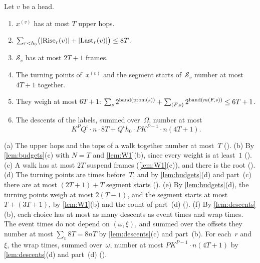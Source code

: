 \begin{lemma}[Totals]\label{lem:totals}
Let $v$ be a head.
\begin{enumerate}[label=(\alph*)]
\item $x^{(v)}$ has at most $T$ upper hops.
\item $\sum_{r<h_0}\bigl(\lvert \mathrm{Rise}_r(v) \rvert+\lvert \mathrm{Last}_r(v) \rvert\bigr)\le8T$.
\item $\mathcal S_v$ has at most $2T+1$ frames.
\item The turning points of~$x^{(v)}$ and the segment starts of~$\mathcal S_v$ number at most $4T+1$ together.
\item They weigh at most $6T+1$: $\sum_s2^{\operatorname{band}(\operatorname{prom}(s))}+\sum_{(F,s)}2^{\operatorname{band}(m(F,s))}\le6T+1$.
\item The descents of the labels, summed over~$\Omega$, number at most
\[
  K^PQ^\iota\cdot n\cdot8T+Q^\iota h_0\cdot PK^{P-1}\cdot n(4T+1).
\]
\end{enumerate}
\end{lemma}

\begin{outline}
(a) The upper hops and the tops of a walk together number at most~$T$ (). (b) By
\cref{lem:budgets}(c) with $N=T$ and \cref{lem:W1}(b), since every weight is at least~$1$ (). (c) A walk
has at most $2T$ suspend frames (\cref{lem:W1}(c)), and there is the root (). (d) The turning points are
times before~$T$, and by \cref{lem:budgets}(d) and part~(c) there are at most $(2T+1)+T$ segment starts
(). (e) By \cref{lem:budgets}(d), the turning points weigh at most $2(T-1)$, and the segment starts at most
$T+(3T+1)$, by \cref{lem:W1}(b) and the count of part~(d) (). (f) By \cref{lem:descents}(b), each choice
has at most as many descents as event times and wrap times. The event times do not depend on $(\omega,\xi)$, and summed over the
offsets they number at most $\sum_v8T=8nT$ by \cref{lem:descents}(c) and part~(b). For each~$r$ and~$\xi$, the wrap times, summed
over~$\omega$, number at most $PK^{P-1}\cdot n(4T+1)$ by \cref{lem:descents}(d) and part~(d) ().
\end{outline}
